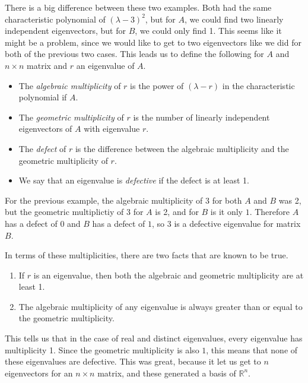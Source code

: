 \documentclass{ximera}
\begin{document}
There is a big difference between these two examples. Both had the same characteristic polynomial of $(\lambda - 3)^2$, but for $A$, we could find two linearly independent eigenvectors, but for $B$, we could only find 1. This seems like it might be a problem, since we would like to get to two eigenvectors like we did for both of the previous two cases. This leads us to define the following for $A$ and $n \times n$ matrix and $r$ an eigenvalue of $A$. 

\begin{definition}
    \begin{itemize}
        \item The \emph{algebraic multiplicity} of $r$ is the power of $(\lambda - r)$ in the characteristic polynomial if $A$.
        \item The \emph{geometric multiplicity} of $r$ is the number of linearly independent eigenvectors of $A$ with eigenvalue  $r$.
        \item The \emph{defect} of $r$ is the difference between the algebraic multiplicity and the geometric multiplicity of $r$. 
        \item We say that an eigenvalue is \emph{defective} if the defect is at least 1. 
    \end{itemize}
\end{definition}

For the previous example, the algebraic multiplicity of $3$ for both $A$ and $B$ was 2, but the geometric multiplictiy of $3$ for $A$ is 2, and for $B$ is it only $1$. Therefore $A$ has a defect of $0$ and $B$ has a defect of $1$, so $3$ is a defective eigenvalue for matrix $B$.

In terms of these multiplicities, there are two facts that are known to be true.
\begin{enumerate}
    \item If $r$ is an eigenvalue, then both the algebraic and geometric multiplicity are at least 1.
    \item The algebraic multiplicity of any eigenvalue is always greater than or equal to the geometric multiplicity.
\end{enumerate}

This tells us that in the case of real and distinct eigenvalues, every eigenvalue has multiplicity 1. Since the geometric multiplicity is also $1$, this means that none of these eigenvalues are defective. This was great, because it let us get to $n$ eigenvectors for an $n \times n$ matrix, and these generated a basis of $\mathbb{R}^n$. 
\end{document}
